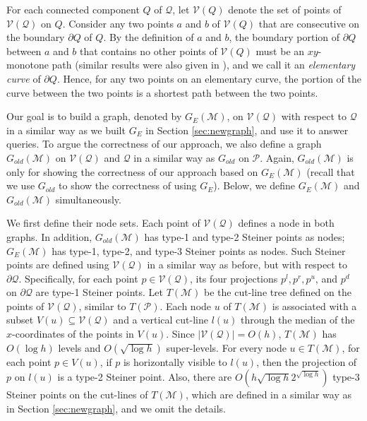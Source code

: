 \documentclass[english,runningheads,11pt]{llncs}
\def\calP{\mathcal{P}}
\def\calM{\mathcal{M}}
\def\calQ{\mathcal{Q}}
\def\calV{\mathcal{V}}
\begin{document}
For each connected component $Q$ of
$\calQ$, let $\calV(Q)$ denote the set of points of $\calV(\calQ)$ on $Q$.
Consider any two points $a$ and $b$ of $\calV(Q)$ that are consecutive on the
boundary $\partial Q$ of $Q$. By the definition of $a$ and
$b$, the boundary portion of $\partial Q$ between $a$ and $b$ that
contains no other points of $\calV(Q)$ must be an $xy$-monotone
path (similar results were also given in
\cite{ref:ChenA11ESA,ref:ChenCo12arXiv,ref:ChenL113STACS,ref:InkuluPl09}), and we
call it an {\em elementary curve} of $\partial Q$. Hence, for any two
points on an elementary curve, the portion of the curve between the
two points is a shortest path between the two points.

Our goal is to build a graph, denoted by $G_E(\calM)$, on $\calV(\calQ)$
with respect to $\calQ$
in a similar way as we built $G_E$ in Section \ref{sec:newgraph}, and use it to
answer queries. To argue the correctness of our approach, we
also define a graph $G_{old}(\calM)$ on $\calV(\calQ)$ and $\calQ$ in a
similar way as $G_{old}$ on $\calP$. Again,
$G_{old}(\calM)$ is only for showing the correctness of our approach
based on $G_E(\calM)$ (recall that we use $G_{old}$ to show the
correctness of using $G_E$). Below, we define $G_E(\calM)$ and
$G_{old}(\calM)$ simultaneously.



We first define their node sets. Each point of $\calV(\calQ)$ defines a
node in both graphs. In addition, $G_{old}(\calM)$ has type-1 and
type-2 Steiner points as nodes; $G_E(\calM)$ has type-1,
type-2, and type-3 Steiner points as nodes. Such Steiner points are
defined using $\calV(\calQ)$ in a similar way as before, but with respect to $\partial\calQ$.
Specifically, for
each point $p \in \calV(\calQ)$, its four projections
$p^l,p^r,p^u$, and $p^d$ on $\partial \calQ$
are type-1 Steiner points. Let $T(\calM)$ be the cut-line tree
defined on the points of $\calV(\calQ)$, similar to $T(\calP)$.
Each node $u$ of $T(\calM)$ is associated
with a subset $V(u)\subseteq \calV(\calQ)$ and a vertical cut-line
$l(u)$ through the median of the $x$-coordinates of the points in $V(u)$.
Since $|\calV(\calQ)|=O(h)$, $T(\calM)$ has
$O(\log h)$ levels and $O(\sqrt{\log h})$ super-levels.
For every node $u\in T(\calM)$, for each point $p\in V(u)$,
if $p$ is horizontally visible to $l(u)$, then the projection of $p$
on $l(u)$ is a type-2 Steiner point.
Also, there are $O(h\sqrt{\log h}2^{\sqrt{\log h}})$ type-3 Steiner
points on the cut-lines of $T(\calM)$, which are defined in
a similar way as in Section \ref{sec:newgraph}, and we omit the details.
\end{document}
